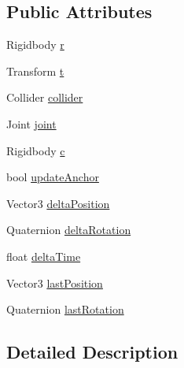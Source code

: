 \subsection*{Public Attributes}
\begin{DoxyCompactItemize}
\item 
Rigidbody \mbox{\hyperlink{class_root_motion_1_1_final_i_k_1_1_ragdoll_utility_1_1_rigidbone_ab061ab892c848657ae082a733f405441}{r}}
\item 
Transform \mbox{\hyperlink{class_root_motion_1_1_final_i_k_1_1_ragdoll_utility_1_1_rigidbone_af42712e3e4f2a83abd66651527fcbdcd}{t}}
\item 
Collider \mbox{\hyperlink{class_root_motion_1_1_final_i_k_1_1_ragdoll_utility_1_1_rigidbone_acd39f32c0b776b3d8a2eb9ee764f31c0}{collider}}
\item 
Joint \mbox{\hyperlink{class_root_motion_1_1_final_i_k_1_1_ragdoll_utility_1_1_rigidbone_aca17a7043d920bd2d497ce23f327640c}{joint}}
\item 
Rigidbody \mbox{\hyperlink{class_root_motion_1_1_final_i_k_1_1_ragdoll_utility_1_1_rigidbone_a32d00211a317ff1acdbcfea1295ca490}{c}}
\item 
bool \mbox{\hyperlink{class_root_motion_1_1_final_i_k_1_1_ragdoll_utility_1_1_rigidbone_ae45b7023e757fa5ca3ff460e70061ebc}{update\+Anchor}}
\item 
Vector3 \mbox{\hyperlink{class_root_motion_1_1_final_i_k_1_1_ragdoll_utility_1_1_rigidbone_afdb4f672ba37eb83777eac0f28a80215}{delta\+Position}}
\item 
Quaternion \mbox{\hyperlink{class_root_motion_1_1_final_i_k_1_1_ragdoll_utility_1_1_rigidbone_a9c1621743a37385f39bdd1f7d39fbc58}{delta\+Rotation}}
\item 
float \mbox{\hyperlink{class_root_motion_1_1_final_i_k_1_1_ragdoll_utility_1_1_rigidbone_a4ebf7a0f7f9c6eec59d33205bb11a84c}{delta\+Time}}
\item 
Vector3 \mbox{\hyperlink{class_root_motion_1_1_final_i_k_1_1_ragdoll_utility_1_1_rigidbone_a7d50f3128ced5791ad49055f02179937}{last\+Position}}
\item 
Quaternion \mbox{\hyperlink{class_root_motion_1_1_final_i_k_1_1_ragdoll_utility_1_1_rigidbone_ad4fe58756bc997f71f0a03cd7b532d7a}{last\+Rotation}}
\end{DoxyCompactItemize}


\subsection{Detailed Description}


